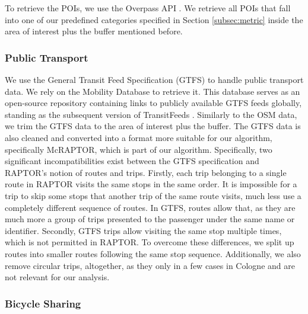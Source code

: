 To retrieve the POIs, we use the Overpass API .
We retrieve all POIs that fall into one of our predefined categories specified in Section \ref{subsec:metric} inside the area of interest plus the buffer mentioned before.

\subsubsection{Public Transport}
\label{subs:public_transport}

We use the General Transit Feed Specification (GTFS)  to handle public transport data.
We rely on the Mobility Database  to retrieve it.
This database serves as an open-source repository containing links to publicly available GTFS feeds globally, standing as the subsequent version of TransitFeeds .
Similarly to the OSM data, we trim the GTFS data to the area of interest plus the buffer.
The GTFS data is also cleaned and converted into a format more suitable for our algorithm, specifically McRAPTOR, which is part of our algorithm.
Specifically, two significant incompatibilities exist between the GTFS specification and RAPTOR's notion of routes and trips.
Firstly, each trip belonging to a single route in RAPTOR visits the same stops in the same order.
It is impossible for a trip to skip some stops that another trip of the same route visits, much less use a completely different sequence of routes.
In GTFS, routes allow that, as they are much more a group of trips presented to the passenger under the same name or identifier.
Secondly, GTFS trips allow visiting the same stop multiple times, which is not permitted in RAPTOR.
To overcome these differences, we split up routes into smaller routes following the same stop sequence.
Additionally, we also remove circular trips, altogether, as they only in a few cases in Cologne and are not relevant for our analysis.


\subsubsection{Bicycle Sharing}
\label{subs:bicycle_sharing}

